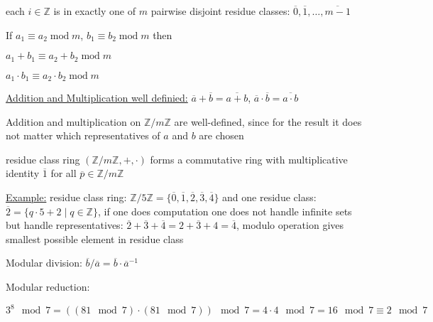 \documentclass[landscape, a4paper]{article}
\begin{document}
\begin{minipage}[t]{0.198\pagewidth}
\begin{betterlist}
\begin{betterlist}
			\item each $i \in \mathbb{Z}$ is in exactly one of $m$ pairwise disjoint residue classes: $\overline{0}, \overline{1}, \ldots, \overline{m-1}$
		\end{betterlist}
		\item If $a_1 \equiv a_2 \operatorname{mod} m$, $b_1 \equiv b_2 \operatorname{mod} m$ then
		\begin{betterlist}
			\item $a_1 + b_1 \equiv a_2 + b_2 \operatorname{mod} m$
			\item $a_1 \cdot b_1 \equiv a_2 \cdot b_2 \operatorname{mod} m$
		\end{betterlist}
		\item \underline{Addition and Multiplication well definied:} $\overline{a} + \overline{b} = \overline{a + b}$, $\overline{a} \cdot \overline{b} = \overline{a \cdot b}$
		\begin{betterlist}
			\item Addition and multiplication on $\mathbb{Z}/m\mathbb{Z}$ are \alert{well-defined}, since for the result it does not matter which representatives of $a$ and $b$ are chosen
			\item residue class ring $(\mathbb{Z}/m\mathbb{Z}, +, \cdot)$ forms a \alert{commutative ring} with \alert{multiplicative identity} $\overline{1}$ for all $\overline{p} \in \mathbb{Z}/m\mathbb{Z}$
			\item \underline{Example:} \alert{residue class ring:} $\mathbb{Z}/5\mathbb{Z} = \{\overline{0}, \overline{1}, \overline{2}, \overline{3}, \overline{4}\}$ and one \alert{residue class:} $\overline{2} = \{q\cdot 5 + 2 \mid q\in \mathbb{Z}\}$, if one does computation one does not handle infinite sets but handle representatives: $\overline{2} + \overline{3} + \overline{4} = \overline{2 + 3 + 4} = \overline{4}$, modulo operation gives smallest possible element in residue class
			\item \alert{Modular division:} $\overline{b}/\overline{a} = \overline{b}\cdot \overline{a}^{-1}$
			\item \alert{Modular reduction:}
			\begin{betterlist}
				\item $3^8 \mod 7 = ((81 \mod 7) \cdot (81 \mod 7)) \mod 7 = 4 \cdot 4 \mod 7 = 16 \mod 7 \equiv 2 \mod 7$
			\end{betterlist}
		\end{betterlist}
	\end{betterlist}
	\fbox{Finite / Galois Fields}
	\begin{betterlist}

\end{betterlist}
\end{minipage}
\end{document}
